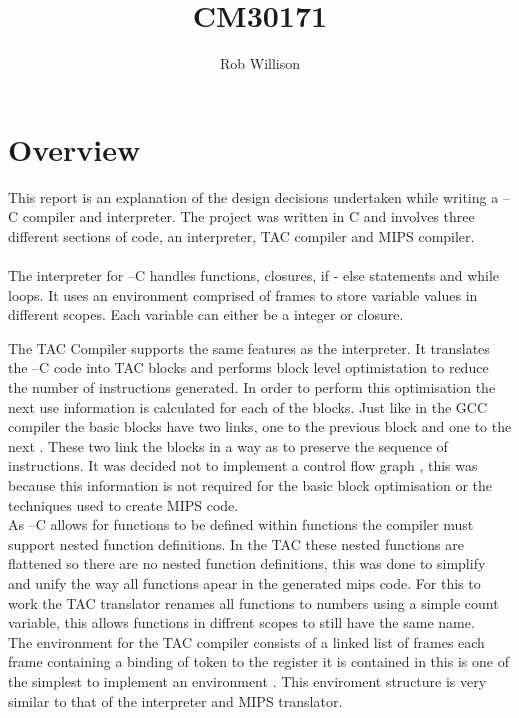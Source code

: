 \documentclass{article}
\begin{document}
\title{CM30171}
\author{Rob Willison}

\maketitle
\tableofcontents

\section{Overview}
This report is an explanation of the design decisions undertaken while writing
a --C compiler and interpreter. The project was written in C and involves three
different sections of code, an interpreter, TAC compiler and MIPS compiler.\\~\\

The interpreter for --C handles functions, closures, if - else statements and while loops.
It uses an environment comprised of frames to store variable values in different scopes. Each
variable can either be a integer or closure.

The TAC Compiler supports the same features as the interpreter. It translates the
--C code into TAC blocks and performs block level optimistation to reduce the number
of instructions generated. In order to perform this optimisation the next use information
is calculated for each of the blocks. Just like in the GCC compiler the basic blocks
have two links, one to the previous block and one to the next \cite{gnublock}. These
two link the blocks in a way as to preserve the sequence of instructions. It was decided
not to implement a control flow graph \cite{Allen:1970:CFA:390013.808479}, this was because
this information is not required for the basic block optimisation or the techniques used
to create MIPS code.\\
As --C allows for functions to be defined within functions the compiler must support
nested function definitions. In the TAC these nested functions are flattened so
there are no nested function definitions, this was done to simplify and unify the way
all functions apear in the generated mips code. For this to work the TAC translator renames
all functions to numbers using a simple count variable, this allows functions in diffrent
scopes to still have the same name.\\
The environment for the TAC compiler consists of a linked list of frames each frame
containing a binding of token to the register it is contained in this is one of the
simplest to implement an environment \cite{Cardelli:1984:CFL:800055.802037}. This
enviroment structure is very similar to that of the interpreter and MIPS translator.\\~\\
\end{document}
